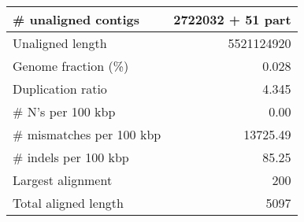 \documentclass[12pt,a4paper]{article}
\begin{document}
\begin{table}[ht]
\begin{center}
\begin{tabular}{|l*{1}{|r}|}
\# unaligned contigs & 2722032 + 51 part \\ \hline
Unaligned length & 5521124920 \\ \hline
Genome fraction (\%) & 0.028 \\ \hline
Duplication ratio & 4.345 \\ \hline
\# N's per 100 kbp & 0.00 \\ \hline
\# mismatches per 100 kbp & 13725.49 \\ \hline
\# indels per 100 kbp & 85.25 \\ \hline
Largest alignment & 200 \\ \hline
Total aligned length & 5097 \\ \hline
\end{tabular}
\end{center}
\end{table}
\end{document}
